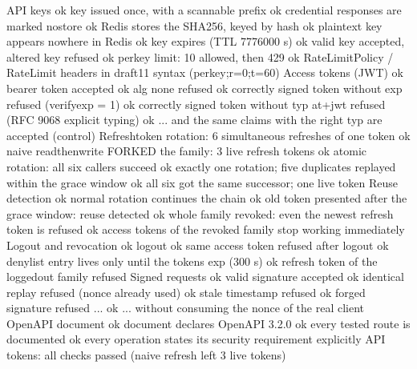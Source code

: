 API keys
  ok  key issued once, with a scannable prefix
  ok  credential responses are marked no\PGZhy{}store
  ok  Redis stores the SHA\PGZhy{}256, keyed by hash
  ok  plaintext key appears nowhere in Redis
  ok  key expires (TTL 7776000 s)
  ok  valid key accepted, altered key refused
  ok  per\PGZhy{}key limit: 10 allowed, then 429
  ok  RateLimit\PGZhy{}Policy / RateLimit headers in draft\PGZhy{}11 syntax (\PGZdq{}perkey\PGZdq{};r=0;t=60)
Access tokens (JWT)
  ok  bearer token accepted
  ok  alg \PGZdq{}none\PGZdq{} refused
  ok  correctly signed token without exp refused (verify\PGZus{}exp =\PGZgt{} 1)
  ok  correctly signed token without typ \PGZdq{}at+jwt\PGZdq{} refused (RFC 9068 explicit typing)
  ok  ... and the same claims with the right typ are accepted (control)
Refresh\PGZhy{}token rotation: 6 simultaneous refreshes of one token
  ok  naive read\PGZhy{}then\PGZhy{}write FORKED the family: 3 live refresh tokens
  ok  atomic rotation: all six callers succeed
  ok  exactly one rotation; five duplicates replayed within the grace window
  ok  all six got the same successor; one live token
Reuse detection
  ok  normal rotation continues the chain
  ok  old token presented after the grace window: reuse detected
  ok  whole family revoked: even the newest refresh token is refused
  ok  access tokens of the revoked family stop working immediately
Logout and revocation
  ok  logout
  ok  same access token refused after logout
  ok  denylist entry lives only until the token\PGZsq{}s exp (300 s)
  ok  refresh token of the logged\PGZhy{}out family refused
Signed requests
  ok  valid signature accepted
  ok  identical replay refused (nonce already used)
  ok  stale timestamp refused
  ok  forged signature refused ...
  ok  ... without consuming the nonce of the real client
OpenAPI document
  ok  document declares OpenAPI 3.2.0
  ok  every tested route is documented
  ok  every operation states its security requirement explicitly
API tokens: all checks passed (naive refresh left 3 live tokens)
